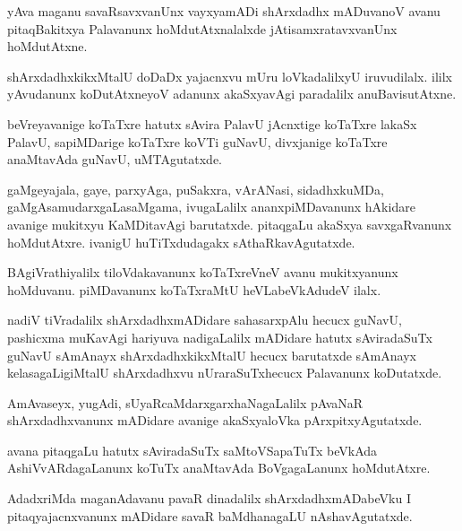 \documentclass{article}
\begin{document}
\begin{mng}%
yAva maganu savaRsavxvanUnx vayxyamADi shArxdadhx mADuvanoV
avanu pitaqBakitxya Palavanunx hoMdutAtxnalalxde jAtisamxratavxvanUnx
hoMdutAtxne.
\end{mng}

\begin{mng}%
shArxdadhxkikxMtalU doDaDx yajacnxvu mUru loVkadalilxyU iruvudilalx.
ililx yAvudanunx koDutAtxneyoV adanunx akaSxyavAgi paradalilx
anuBavisutAtxne.
\end{mng}

\begin{mng}%
beVreyavanige koTaTxre hatutx sAvira PalavU jAcnxtige koTaTxre
lakaSx PalavU, sapiMDarige koTaTxre koVTi guNavU, divxjanige koTaTxre anaMtavAda
guNavU, uMTAgutatxde.
\end{mng}

\begin{mng}%
gaMgeyajala, gaye, parxyAga, puSakxra, vArANasi,
sidadhxkuMDa, gaMgAsamudarxgaLasaMgama, ivugaLalilx ananxpiMDavanunx hAkidare
avanige mukitxyu KaMDitavAgi barutatxde. pitaqgaLu akaSxya savxgaRvanunx
hoMdutAtxre. ivanigU huTiTxdudagakx sAthaRkavAgutatxde.
\end{mng}

\begin{mng}%
BAgiVrathiyalilx tiloVdakavanunx koTaTxreVneV avanu mukitxyanunx
hoMduvanu. piMDavanunx koTaTxraMtU heVLabeVkAdudeV ilalx.
\end{mng}

\begin{mng}%
nadiV tiVradalilx shArxdadhxmADidare sahasarxpAlu hecucx guNavU,
pashicxma muKavAgi hariyuva nadigaLalilx mADidare hatutx sAviradaSuTx guNavU sAmAnayx shArxdadhxkikxMtalU hecucx barutatxde sAmAnayx kelasagaLigiMtalU
shArxdadhxvu nUraraSuTxhecucx Palavanunx koDutatxde.
\end{mng}

\begin{mng}%
AmAvaseyx, yugAdi, sUyaRcaMdarxgarxhaNagaLalilx pAvaNaR
shArxdadhxvanunx mADidare avanige akaSxyaloVka pArxpitxyAgutatxde.
\end{mng}

\begin{mng}%
avana pitaqgaLu hatutx sAviradaSuTx saMtoVSapaTuTx beVkAda
AshiVvARdagaLanunx koTuTx anaMtavAda BoVgagaLanunx hoMdutAtxre.
\end{mng}

\begin{mng}%
AdadxriMda maganAdavanu pavaR dinadalilx shArxdadhxmADabeVku
I pitaqyajacnxvanunx mADidare savaR baMdhanagaLU nAshavAgutatxde.
\end{mng}
\end{document}
